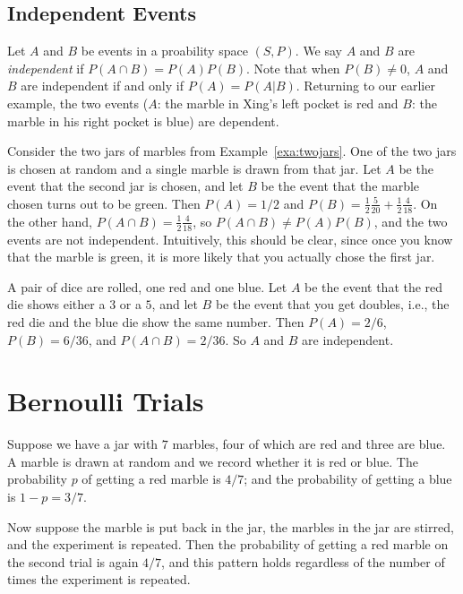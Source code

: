 \subsection{Independent Events}

Let $A$ and $B$ be events in a proability space $(S,P)$.  We say
$A$ and $B$ are \textit{independent} if $P(A\cap B)=P(A)P(B)$.
Note that when $P(B)\neq 0$, $A$ and $B$ are independent if
and only if $P(A)=P(A|B)$.  Returning to our earlier example, the two
events ($A$: the marble in Xing's left pocket is red and $B$: the marble in
his right pocket is blue) are dependent.

\begin{example}
Consider the two jars of marbles from Example~\ref{exa:twojars}.
One of the two jars is chosen at random and a single marble is
drawn from that jar.  Let $A$ be the event that the second jar is
chosen, and let $B$ be the event that the marble chosen turns out
to be green.  Then $P(A)=1/2$ and $P(B)=\frac{1}{2}\frac{5}{20}+
\frac{1}{2}\frac{4}{18}$.  On the other hand, $P(A\cap B)=\frac{1}{2}
\frac{4}{18}$, so $P(A\cap B)\neq P(A)P(B)$, and the two events are 
not independent.  Intuitively, this should be clear, since once you
know that the marble is green, it is more likely that you actually
chose the first jar.
\end{example}

\begin{example}\label{exa:twodie}
A pair of dice are rolled, one red and one blue. Let $A$ be the event
that the red die shows either a $3$ or a $5$, and let $B$ be the event that you
get doubles, i.e., the red die and the blue die show the same number.
Then $P(A)=2/6$, $P(B)=6/36$, and $P(A\cap B) = 2/36$.  So $A$ and $B$
are independent. 
\end{example}

\section{Bernoulli Trials}

Suppose we have a jar with $7$ marbles, four of which are red
and three are blue.  A marble is drawn at random and we record whether it
is red or blue.  The probability $p$ of getting a red marble
is $4/7$; and the probability of getting a blue is $1-p=3/7$.

Now suppose the marble is put back in the jar, the marbles in the
jar are stirred, and the experiment is repeated.  Then the probability
of getting a red marble on the second trial is again $4/7$, 
and this pattern holds regardless of the number of times the experiment 
is repeated.  

